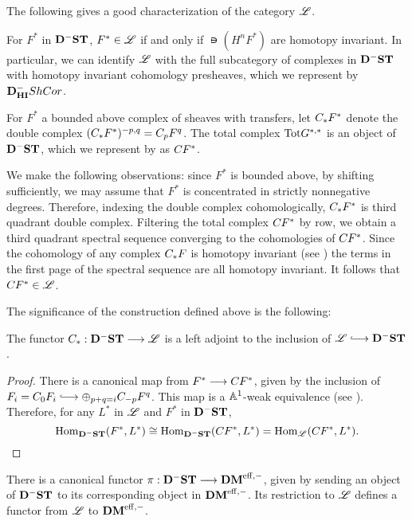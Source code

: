 The following gives a good characterization of the category 
$\ALocal$.

\begin{prop}
For $F^*$ in $\DShCor$, $F^* \in \ALocal$ if and only if
$\nis(H^n F^*)$ are homotopy invariant. In particular, we can
identify $\ALocal$ with the full subcategory of complexes in 
$\DShCor$ with homotopy invariant cohomology presheaves, which we 
represent by $\DCat^-_{\HI} \ShCor$.
\end{prop}

\begin{defn}
For $F^*$ a bounded above complex of sheaves with transfers,
let $\suslC F^*$ denote the double complex $(\suslC F^*)^{-p, q} = 
\suslC[p] F^q$. The total complex $\Tot G^{*,*}$ is an object of 
$\DShCor$, which we represent by as $\suslC[] F^*$. 
\end{defn}

We make the following observations: since $F^*$ is bounded above,
by shifting sufficiently, we may assume that $F^*$ is concentrated
in strictly nonnegative degrees. Therefore, indexing the double
complex cohomologically, $\suslC F^*$ is third quadrant double 
complex. Filtering the total complex $\suslC[] F^*$ by row, we 
obtain a third quadrant spectral sequence converging to the 
cohomologies of $\suslC[] F^*$. Since the cohomology of any complex
$\suslC F$ is homotopy invariant (see \cite[2.19]{MVW}) the terms 
in the first page of the spectral sequence are all homotopy 
invariant. It follows that $\suslC[] F^* \in \ALocal$.

The significance of the construction defined above is the 
following:

\begin{prop}\label{prop_suslC_ALocal}
The functor $\suslC : \DShCor \to \ALocal$ is a left adjoint to
the inclusion of $\ALocal \into \DShCor$.
\end{prop}

\begin{proof}
There is a canonical map from $F^* \to \suslC[] F^*$,
given by the inclusion of $F_i = \suslC[0] F_i \into \oplus_{p + 
q = i} \suslC[-p] F^q$. This map is a $\A^1$-weak equivalence
(see \cite[14.4]{MVW}). Therefore, for any $L^*$ in $\ALocal$
and $F^*$ in $\DShCor$,
\[
\hom_{\DShCor}(F^*, L^*) \cong \hom_{\DShCor}(\suslC[] F^*, L^*)
   = \hom_{\ALocal}(\suslC[] F^*, L^*).
\]
\end{proof}

There is a canonical functor $\pi: \DShCor \to \DMeff$, given
by sending an object of $\DShCor$ to its corresponding object in
$\DMeff$. Its restriction to $\ALocal$ defines a functor from
$\ALocal$ to $\DMeff$.


